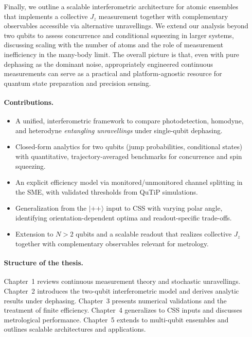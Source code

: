 Finally, we outline a scalable interferometric architecture for atomic ensembles that implements a collective \(J_z\) measurement together with complementary observables accessible via alternative unravellings. We extend our analysis beyond two qubits to assess concurrence and conditional squeezing in larger systems, discussing scaling with the number of atoms and the role of measurement inefficiency in the many-body limit. The overall picture is that, even with pure dephasing as the dominant noise, appropriately engineered continuous measurements can serve as a practical and platform-agnostic resource for quantum state preparation and precision sensing.

\paragraph{Contributions.}
\begin{itemize}
	\item A unified, interferometric framework to compare photodetection, homodyne, and heterodyne \emph{entangling unravellings} under single-qubit dephasing.
	\item Closed-form analytics for two qubits (jump probabilities, conditional states) with quantitative, trajectory-averaged benchmarks for concurrence and spin squeezing.
	\item An explicit efficiency model via monitored/unmonitored channel splitting in the SME, with validated thresholds from \textsf{QuTiP} simulations.
	\item Generalization from the \(|++\rangle\) input to CSS with varying polar angle, identifying orientation-dependent optima and readout-specific trade-offs.
	\item Extension to \(N>2\) qubits and a scalable readout that realizes collective \(J_z\) together with complementary observables relevant for metrology.
\end{itemize}

\paragraph{Structure of the thesis.}
Chapter~1 reviews continuous measurement theory and stochastic unravellings. Chapter~2 introduces the two-qubit interferometric model and derives analytic results under dephasing. Chapter~3 presents numerical validations and the treatment of finite efficiency. Chapter~4 generalizes to CSS inputs and discusses metrological performance. Chapter~5 extends to multi-qubit ensembles and outlines scalable architectures and applications.
